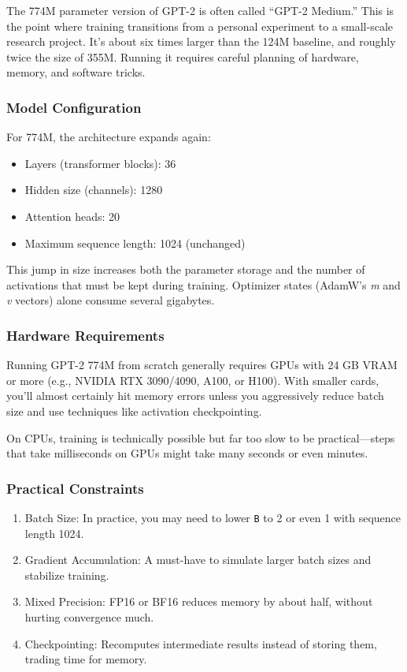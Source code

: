 \documentclass[
  letterpaper,
  DIV=11,
  numbers=noendperiod]{scrreprt}
\providecommand{\tightlist}{%
  \setlength{\itemsep}{0pt}\setlength{\parskip}{0pt}}
\begin{document}
The 774M parameter version of GPT-2 is often called ``GPT-2 Medium.''
This is the point where training transitions from a personal experiment
to a small-scale research project. It's about six times larger than the
124M baseline, and roughly twice the size of 355M. Running it requires
careful planning of hardware, memory, and software tricks.

\subsubsection{Model Configuration}\label{model-configuration-1}

For 774M, the architecture expands again:

\begin{itemize}
\tightlist
\item
  Layers (transformer blocks): 36
\item
  Hidden size (channels): 1280
\item
  Attention heads: 20
\item
  Maximum sequence length: 1024 (unchanged)
\end{itemize}

This jump in size increases both the parameter storage and the number of
activations that must be kept during training. Optimizer states (AdamW's
\emph{m} and \emph{v} vectors) alone consume several gigabytes.

\subsubsection{Hardware Requirements}\label{hardware-requirements}

Running GPT-2 774M from scratch generally requires GPUs with 24 GB VRAM
or more (e.g., NVIDIA RTX 3090/4090, A100, or H100). With smaller cards,
you'll almost certainly hit memory errors unless you aggressively reduce
batch size and use techniques like activation checkpointing.

On CPUs, training is technically possible but far too slow to be
practical---steps that take milliseconds on GPUs might take many seconds
or even minutes.

\subsubsection{Practical Constraints}\label{practical-constraints}

\begin{enumerate}
\def\labelenumi{\arabic{enumi}.}
\tightlist
\item
  Batch Size: In practice, you may need to lower \texttt{B} to 2 or even
  1 with sequence length 1024.
\item
  Gradient Accumulation: A must-have to simulate larger batch sizes and
  stabilize training.
\item
  Mixed Precision: FP16 or BF16 reduces memory by about half, without
  hurting convergence much.
\item
  Checkpointing: Recomputes intermediate results instead of storing
  them, trading time for memory.
\end{enumerate}
\end{document}
